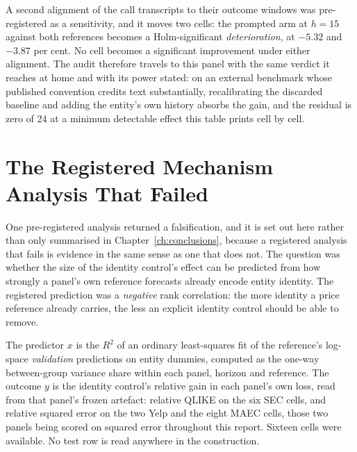 A second alignment of the call transcripts to their outcome windows was
pre-registered as a sensitivity, and it moves two cells: the prompted
arm at $h{=}15$ against both references becomes a Holm-significant
\emph{deterioration}, at $-5.32$ and $-3.87$ per cent. No cell becomes a
significant improvement under either alignment.
The audit therefore travels to this panel with the same verdict it reaches
at home and with its power stated: on an external benchmark whose published
convention credits text substantially, recalibrating the discarded baseline
and adding the entity's own history absorbs the gain, and the residual is
zero of 24 at a minimum detectable effect this table prints cell by cell.

\FloatBarrier
\section{The Registered Mechanism Analysis That Failed}
\label{app:mechanism}

One pre-registered analysis returned a falsification, and it is set out here
rather than only summarised in Chapter~\ref{ch:conclusions}, because a
registered analysis that fails is evidence in the same sense as one that does
not. The question was whether the size of the identity control's effect can be
predicted from how strongly a panel's own reference forecasts already encode
entity identity. The registered prediction was a \emph{negative} rank
correlation: the more identity a price reference already carries, the less an
explicit identity control should be able to remove.

The predictor $x$ is the $R^{2}$ of an ordinary least-squares fit of the
reference's log-space \emph{validation} predictions on entity dummies, computed
as the one-way between-group variance share within each panel, horizon and
reference. The outcome $y$ is the identity control's relative gain in each
panel's own loss, read from that panel's frozen artefact: relative QLIKE on the
six SEC cells, and relative squared error on the two Yelp and the eight MAEC
cells, those two panels being scored on squared error throughout this report.
Sixteen cells were available. No test row is read anywhere in the construction.

